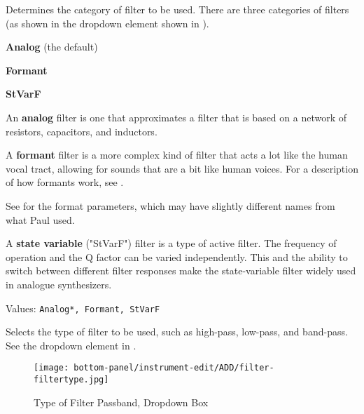    \setcounter{ItemCounter}{0}      %

   Determines the category of filter to be used.
   There are three categories of filters
   (as shown in the dropdown element shown in
   ).

\begin{enumber}                     %
   \item \textbf{Analog} (the default)
   \item \textbf{Formant}
   \item \textbf{StVarF}
\end{enumber}

   An \textbf{analog} filter
   is one that approximates a filter that is based on
   a network of resistors, capacitors, and inductors.

   A \textbf{formant} filter
   is a more complex kind of filter that acts a lot
   like the human vocal tract, allowing for sounds that
   are a bit like human voices.  For a description of how formants work,
   see .

   See  for the format parameters,
   which may have slightly different names from what Paul used.

   A \textbf{state variable} ("StVarF") filter
   is a type of active filter.
   The frequency of operation and the Q factor can be varied independently.
   This and the ability to switch between different filter responses make the
   state-variable filter widely used in analogue synthesizers.

   Values: \texttt{Analog*, Formant, StVarF}

   Selects the type of filter to be used, such as high-pass, low-pass,
   and band-pass.
   See the dropdown element in .

\begin{figure}[H]
   \centering 
   \texttt{[image: bottom-panel/instrument-edit/ADD/filter-filtertype.jpg]}
   \caption[Filter Type Dropdown]{Type of Filter Passband, Dropdown Box}
   \label{fig:filter_type_dropdown} 
\end{figure}

